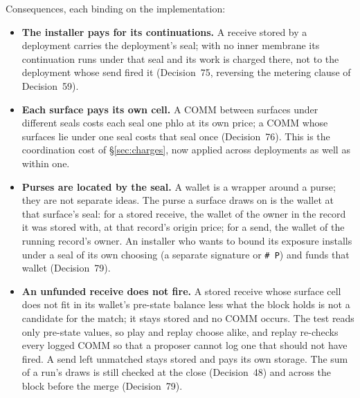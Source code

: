\documentclass[11pt]{article}
\begin{document}
Consequences, each binding on the implementation:
\begin{itemize}
\item \textbf{The installer pays for its continuations.} A receive stored by a deployment carries the deployment's seal; with no inner membrane its continuation runs under that seal and its work is charged there, not to the deployment whose send fired it (Decision~75, reversing the metering clause of Decision~59).
\item \textbf{Each surface pays its own cell.} A COMM between surfaces under different seals costs each seal one phlo at its own price; a COMM whose surfaces lie under one seal costs that seal once (Decision~76). This is the coordination cost of \S\ref{sec:charges}, now applied across deployments as well as within one.
\item \textbf{Purses are located by the seal.} A wallet is a wrapper around a purse; they are not separate ideas. The purse a surface draws on is the wallet at that surface's seal: for a stored receive, the wallet of the owner in the record it was stored with, at that record's origin price; for a send, the wallet of the running record's owner. An installer who wants to bound its exposure installs under a seal of its own choosing (a separate signature or \texttt{\# P}) and funds that wallet (Decision~79).
\item \textbf{An unfunded receive does not fire.} A stored receive whose surface cell does not fit in its wallet's pre-state balance less what the block holds is not a candidate for the match; it stays stored and no COMM occurs. The test reads only pre-state values, so play and replay choose alike, and replay re-checks every logged COMM so that a proposer cannot log one that should not have fired. A send left unmatched stays stored and pays its own storage. The sum of a run's draws is still checked at the close (Decision~48) and across the block before the merge (Decision~79).

\end{itemize}
\end{document}
